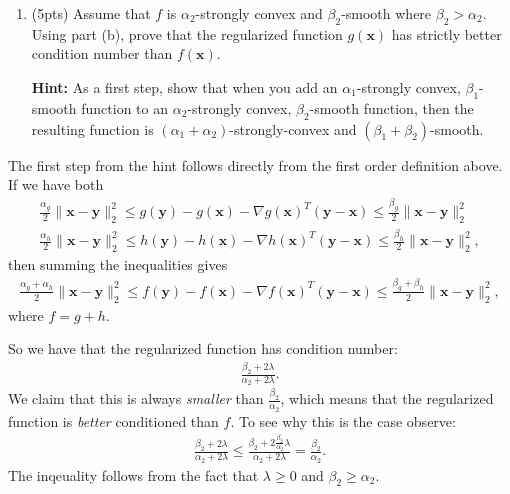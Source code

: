 \documentclass[10pt]{article}
\newcommand{\bv}[1]{\mathbf{#1}}
\begin{document}
\begin{enumerate}[label=(\alph*)]
	\item (5pts) Assume that $f$ is $\alpha_2$-strongly convex and $\beta_2$-smooth where $\beta_2 > \alpha_2$.  Using part (b), prove that the regularized function $g(\bv{x})$ has strictly better condition number than  $f(\bv{x})$. 
	
	\textbf{Hint:} As a first step, show that when you add an $\alpha_1$-strongly convex, $\beta_1$-smooth function to an  $\alpha_2$-strongly convex, $\beta_2$-smooth function, then the resulting function is $(\alpha_1 + \alpha_2)$-strongly-convex and $(\beta_1 + \beta_2)$-smooth.
\end{enumerate}

The first step from the hint follows directly from the first order definition above. If we have both
\begin{align*}
	\frac{\alpha_g}{2}\|\bv{x}-\bv{y}\|_2^2 \leq g(\bv{y})-g(\bv{x}) - \nabla g(\bv{x})^T(\bv{y} - \bv{x}) \leq \frac{\beta_g}{2}\|\bv{x}-\bv{y}\|_2^2\\
	\frac{\alpha_h}{2}\|\bv{x}-\bv{y}\|_2^2 \leq h(\bv{y})-h(\bv{x}) - \nabla h(\bv{x})^T(\bv{y} - \bv{x}) \leq \frac{\beta_h}{2}\|\bv{x}-\bv{y}\|_2^2,
\end{align*}
then summing the inequalities gives 
\begin{align*}
	\frac{\alpha_g + \alpha_h}{2}\|\bv{x}-\bv{y}\|_2^2 \leq f(\bv{y})-f(\bv{x}) - \nabla f(\bv{x})^T(\bv{y} - \bv{x}) \leq \frac{\beta_g + \beta_h}{2}\|\bv{x}-\bv{y}\|_2^2,
\end{align*}
where $f = g + h$. 

So we have that the regularized function has condition number:
\begin{align*}
	\frac{\beta_2 + 2\lambda}{\alpha_2 + 2\lambda}.
\end{align*}
We claim that this is always \emph{smaller} than $\frac{\beta_2}{\alpha_2}$, which means that the regularized function is \emph{better} conditioned than $f$. To see why this is the case observe:
\begin{align*}
	\frac{\beta_2 + 2\lambda}{\alpha_2 + 2\lambda} \leq \frac{\beta_2 + 2\frac{\beta_2}{\alpha_2}\lambda}{\alpha_2 + 2\lambda} = \frac{\beta_2}{\alpha_2}.
\end{align*}
The inqeuality follows from the fact that $\lambda \geq 0$ and $\beta_2 \geq \alpha_2$.
\end{document}
